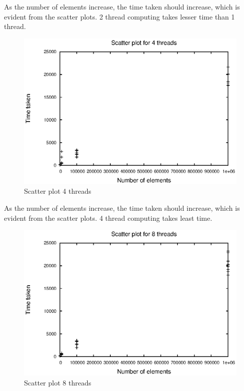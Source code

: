 \documentclass[a4paper, 12pt]{report}
\begin{document}
\vskip 0.5in
{\Large As the number of elements increase, the time taken should increase, which is evident from the scatter plots. 2 thread computing takes lesser time than 1 thread.}

\begin{figure}[H]
\centering
\includegraphics[width=1\textwidth]{scatter_4.eps}
 \caption{Scatter plot 4 threads}
\end{figure}

\vskip 0.5in
{\Large As the number of elements increase, the time taken should increase, which is evident from the scatter plots. 4 thread computing takes least time.}

\begin{figure}[H]
\centering
\includegraphics[width=1\textwidth]{scatter_8.eps}
 \caption{Scatter plot 8 threads}
 \label{fig:cc_get}
\end{figure}
\end{document}
